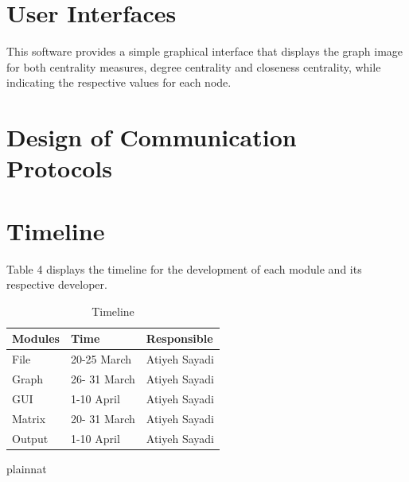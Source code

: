 \documentclass[12pt, titlepage]{article}
\begin{document}
\section{User Interfaces}

This software provides a simple graphical interface that displays the graph image for both centrality measures, degree centrality and closeness centrality, while indicating the respective values for each node.

\section{Design of Communication Protocols}

\section{Timeline}


Table 4 displays the timeline for the development of each module and its respective developer.

\begin{table}[H]
\centering
\begin{tabular}{p{} p{}  p{}}
\toprule
 \textbf{Modules} & \textbf{Time} & \textbf{Responsible} \\
\midrule
File& 20-25 March& Atiyeh Sayadi\\
Graph & 26- 31 March& Atiyeh Sayadi\\
GUI & 1-10 April& Atiyeh Sayadi\\
Matrix & 20- 31 March& Atiyeh Sayadi\\
Output & 1-10 April& Atiyeh Sayadi\\
\bottomrule
\end{tabular}
\caption{Timeline}
\end{table}

 {plainnat}


\newpage{}
\end{document}
